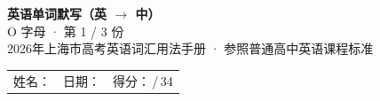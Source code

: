 \documentclass[10pt,a4paper]{article}
\begin{document}
\pagestyle{plain}

\begin{center}
{\LARGE\bfseries 英语单词默写（英 $\to$ 中）}\\[0.22em]
{\large O 字母 · 第 1 / 3 份}\\[0.18em]
{\small 2026年上海市高考英语词汇用法手册 · 参照普通高中英语课程标准}
\end{center}

\vspace{0.25em}
\noindent\begin{tabular}{@{}p{}@{}p{}@{}p{}@{}}
姓名：\underline{\hspace{2.0cm}} & 日期：\underline{\hspace{2.0cm}} & 得分：\underline{\hspace{1.3cm}}\,/\,34 \\
\end{tabular}

\vspace{0.3em}

\vspace{0.08em}
\end{document}
